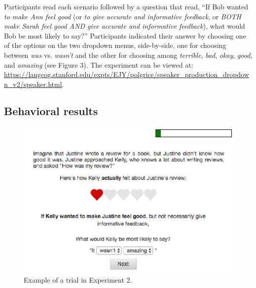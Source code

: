 \documentclass[10pt, letterpaper]{article}
\newenvironment{CodeChunk}{}{}
\begin{document}
Participants read each scenario followed by a question that read, ``If
Bob wanted \emph{to make Ann feel good} (or \emph{to give accurate and
informative feedback}, or \emph{BOTH make Sarah feel good AND give
accurate and informative feedback}), what would Bob be most likely to
say?'' Participants indicated their answer by choosing one of the
options on the two dropdown menus, side-by-side, one for choosing
between \emph{was} vs. \emph{wasn't} and the other for choosing among
\emph{terrible}, \emph{bad}, \emph{okay}, \emph{good}, and
\emph{amazing} (see Figure 3). The experiment can be viewed at:
\url{https://langcog.stanford.edu/expts/EJY/polgrice/speaker_production_dropdown_v2/speaker.html}.

\subsection{Behavioral results}\label{behavioral-results}

\begin{CodeChunk}
\captionsetup{width=0.8\textwidth}\begin{figure}[b]

{\centering \includegraphics{figs/expt2_screen-1} 

}

\caption[Example of a trial in Experiment 2]{Example of a trial in Experiment 2.}\label{fig:expt2_screen}
\end{figure}
\end{CodeChunk}
\end{document}
